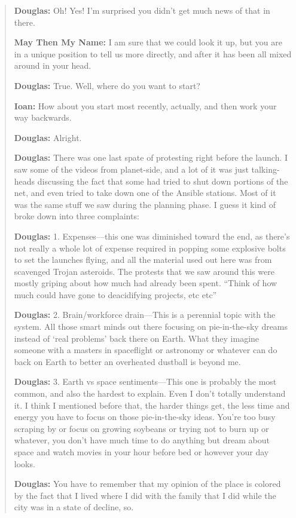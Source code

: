 \begin{quote}
\textbf{Douglas:} Oh! Yes! I'm surprised you didn't get much news of that in there.

\textbf{May Then My Name:} I am sure that we could look it up, but you are in a unique position to tell us more directly, and after it has been all mixed around in your head.

\textbf{Douglas:} True. Well, where do you want to start?

\textbf{Ioan:} How about you start most recently, actually, and then work your way backwards.

\textbf{Douglas:} Alright.

\textbf{Douglas:} There was one last spate of protesting right before the launch. I saw some of the videos from planet-side, and a lot of it was just talking-heads discussing the fact that some had tried to shut down portions of the net, and even tried to take down one of the Ansible stations. Most of it was the same stuff we saw during the planning phase. I guess it kind of broke down into three complaints:

\textbf{Douglas:} 1. Expenses---this one was diminished toward the end, as there's not really a whole lot of expense required in popping some explosive bolts to set the launches flying, and all the material used out here was from scavenged Trojan asteroids. The protests that we saw around this were mostly griping about how much had already been spent. ``Think of how much could have gone to deacidifying projects, etc etc''

\textbf{Douglas:} 2. Brain/workforce drain---This is a perennial topic with the system. All those smart minds out there focusing on pie-in-the-sky dreams instead of `real problems' back there on Earth. What they imagine someone with a masters in spaceflight or astronomy or whatever can do back on Earth to better an overheated dustball is beyond me.

\textbf{Douglas:} 3. Earth vs space sentiments---This one is probably the most common, and also the hardest to explain. Even I don't totally understand it. I think I mentioned before that, the harder things get, the less time and energy you have to focus on those pie-in-the-sky ideas. You're too busy scraping by or focus on growing soybeans or trying not to burn up or whatever, you don't have much time to do anything but dream about space and watch movies in your hour before bed or however your day looks.

\textbf{Douglas:} You have to remember that my opinion of the place is colored by the fact that I lived where I did with the family that I did while the city was in a state of decline, so.


\end{quote}
